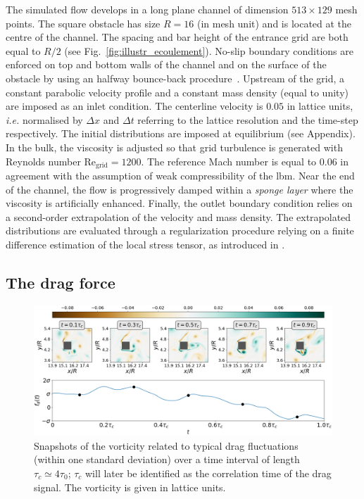 \documentclass[pre,aps,floatfix,10pt,superscriptaddress, notitlepage,preprint]{revtex4-1}
\begin{document}
%
The simulated flow develops in a long plane channel of dimension $513 \times 129$ mesh points. The square obstacle has size $R=16$ (in mesh unit) and is located at the centre of the channel. The spacing and bar height of the entrance grid are both equal to $R/2$ (see Fig.~\ref{fig:illustr_ecoulement}). 
%
No-slip boundary conditions are enforced on top and bottom walls of the channel and on the surface of the obstacle by using an halfway bounce-back procedure~\cite{lbm_book}.  
%
Upstream of the grid, a constant parabolic velocity profile and a constant mass density (equal to unity) are imposed as an inlet condition. 
The centerline velocity is $0.05$ in lattice units, \textit{i.e.} normalised by $\Delta x$ and $\Delta t$ referring to the lattice resolution and the time-step respectively. The initial distributions are imposed at equilibrium (see Appendix). 
In the bulk, the viscosity is adjusted so that grid turbulence is generated with Reynolds number $\mathrm{Re_{grid}}=1200$. The reference Mach number is equal to $0.06$ in agreement with the assumption of weak compressibility of the \ac{lbm}. 
Near the end of the channel, the flow is progressively damped within a \textit{sponge layer} where the viscosity is artificially enhanced.
Finally, the outlet boundary condition relies on a second-order extrapolation of the velocity and mass density.
The extrapolated distributions are evaluated through a regularization procedure relying on a finite difference estimation of the local stress tensor, as introduced in \cite{latt2008straight}. 

	
\subsection{The drag force}
\label{sec:drag_force}
	
\begin{figure}
	\centering
	\includegraphics[width=\linewidth]{ecoulement_typique/ecoulement_typique.png}
	\caption{Snapshots of the vorticity related to typical drag fluctuations (within one standard deviation) over a time interval of length $\tau_c \simeq 4\tau_0$; $\tau_c$ will later be identified as the correlation time of the drag signal.
	The vorticity is given in lattice units.}
	\label{fig:typical_vorticity}
\end{figure}
\end{document}
